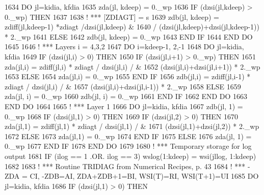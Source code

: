 \begin{DoxyCode}
1634   \textcolor{keywordflow}{DO} jl=kidia, kfdia
1635     zda(jl, kdeep) = 0.\_wp
1636     \textcolor{keywordflow}{IF} (dzsi(jl,kdeep) > 0.\_wp) \textcolor{keywordflow}{THEN}
1637 
1638 \textcolor{comment}{!     *** [ZDIAGT] = s}
1639       zdb(jl, kdeep) = zdiff(jl,kdeep-1) *zdiagt /dzsi(jl,kdeep)  &
1640           / (dzsi(jl,kdeep)+dzsi(jl,kdeep-1)) * 2.\_wp
1641     \textcolor{keywordflow}{ELSE}
1642       zdb(jl, kdeep) = 0.\_wp
1643 \textcolor{keywordflow}{    END IF}
1644 \textcolor{keywordflow}{  END DO}
1645 
1646 \textcolor{comment}{! *** Layers i = 4,3,2}
1647   \textcolor{keywordflow}{DO} i=kdeep-1, 2,-1
1648     \textcolor{keywordflow}{DO} jl=kidia, kfdia
1649       \textcolor{keywordflow}{IF} (dzsi(jl,i) > 0) \textcolor{keywordflow}{THEN}
1650         \textcolor{keywordflow}{IF} (dzsi(jl,i+1) > 0.\_wp) \textcolor{keywordflow}{THEN}
1651           zda(jl,i) = zdiff(jl,i) * zdiagt / dzsi(jl,i) /  &
1652               (dzsi(jl,i)+dzsi(jl,i+1)) * 2.\_wp
1653         \textcolor{keywordflow}{ELSE}
1654           zda(jl,i) = 0.\_wp
1655 \textcolor{keywordflow}{        END IF}
1656         zdb(jl,i) = zdiff(jl,i-1) * zdiagt / dzsi(jl,i) /  &
1657             (dzsi(jl,i)+dzsi(jl,i-1)) * 2.\_wp
1658       \textcolor{keywordflow}{ELSE}
1659         zda(jl, i) = 0.\_wp
1660         zdb(jl, i) = 0.\_wp
1661 \textcolor{keywordflow}{      END IF}
1662 \textcolor{keywordflow}{    END DO}
1663 \textcolor{keywordflow}{  END DO}
1664 
1665 \textcolor{comment}{! *** Layer 1}
1666   \textcolor{keywordflow}{DO} jl=kidia, kfdia
1667     zdb(jl, 1) = 0.\_wp
1668     \textcolor{keywordflow}{IF} (dzsi(jl,1) > 0) \textcolor{keywordflow}{THEN}
1669       \textcolor{keywordflow}{IF} (dzsi(jl,2) > 0) \textcolor{keywordflow}{THEN}
1670         zda(jl,1) = zdiff(jl,1) * zdiagt / dzsi(jl,1) /  &
1671             (dzsi(jl,1)+dzsi(jl,2)) * 2.\_wp
1672       \textcolor{keywordflow}{ELSE}
1673         zda(jl,1) = 0.\_wp
1674 \textcolor{keywordflow}{      END IF}
1675     \textcolor{keywordflow}{ELSE}
1676       zda(jl, 1) = 0.\_wp
1677 \textcolor{keywordflow}{    END IF}
1678 \textcolor{keywordflow}{  END DO}
1679 
1680 \textcolor{comment}{! *** Temporary storage for log output}
1681   \textcolor{keywordflow}{IF} (ilog == 1 .OR. ilog == 3) wslog(1:kdeep) = wsi(jllog, 1:kdeep)
1682 
1683 \textcolor{comment}{! *** Routine TRIDIAG from Numerical Recipes, p. 43}
1684 \textcolor{comment}{! *** -ZDA = CI, -ZDB=AI, ZDA+ZDB+1=BI, WSI(T)=RI, WSI(T+1)=UI}
1685   \textcolor{keywordflow}{DO} jl=kidia, kfdia
1686     \textcolor{keywordflow}{IF} (dzsi(jl,1) > 0) \textcolor{keywordflow}{THEN}

\end{DoxyCode}
